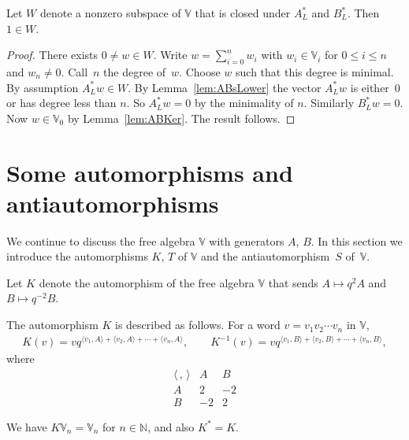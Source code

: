\begin{Lemma}\label{lem:ABirred}
Let $W$ denote a nonzero subspace of $\mathbb V$ that is closed under
$A^*_L$ and $B^*_L$. Then $1 \in W$.
\end{Lemma}
\begin{proof} There exists $0 \not=w \in W$. Write $w = \sum\limits_{i=0}^n w_i$ with $w_i \in \mathbb V_i$ for $0 \leq i \leq n$ and $w_n \not=0$. Call~$n$ the degree of~$w$. Choose $w$ such that this degree is minimal. By assumption $A^*_L w \in W$. By Lemma~\ref{lem:ABsLower} the vector
$A^*_Lw$ is either~0 or has degree less than $n$. So $A^*_Lw=0$ by the minimality of $n$.
Similarly $B^*_Lw=0$. Now $w \in \mathbb V_0$ by Lemma~\ref{lem:ABKer}. The result follows.
\end{proof}

\section{Some automorphisms and antiautomorphisms}\label{section5}

We continue to discuss the free algebra $\mathbb V$ with generators $A$, $B$. In this section we introduce
the automorphisms $K$, $T$ of $\mathbb V$ and the antiautomorphism~$S$ of~$\mathbb V$.
\begin{Definition}\label{def:Kdef} Let $K$ denote the automorphism of the free algebra $\mathbb V$
that sends $A\mapsto q^2 A$ and $B\mapsto q^{-2}B$.
\end{Definition}

The automorphism $K$ is described as follows. For a word $v=v_1 v_2 \cdots v_n$ in $\mathbb V$,
\begin{gather*}
K(v) =v q^{\langle v_1, A\rangle+
\langle v_2, A\rangle+ \cdots+
\langle v_n, A\rangle},
\qquad
K^{-1}(v) =
v q^{\langle v_1, B\rangle+
\langle v_2, B\rangle+ \cdots+
\langle v_n, B\rangle
},
\end{gather*}
where
\[
\begin{array}{c|cc}
\langle\,,\,\rangle & A & B
 \\ \hline
A &2 & -2 \\
B & -2 & 2
 \end{array}
\]

We have $K\mathbb V_n = \mathbb V_n $ for $n \in \mathbb N$, and also $K^*=K$.


